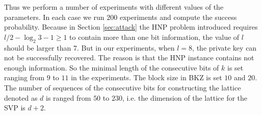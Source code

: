 Thus we perform a number of experiments with different values of the parameters.
 In each case we run $200$ experiments and compute the success probability.
Because in Section \ref{sec:attack} the HNP problem introduced requires $l/2 - \log_{2}{3} -1 \geq 1$ to contain more than one bit information, the value of $l$ should be larger than $7$.
 But in our experiments, when $l = 8$, the private key can not be successfully recovered.
  The reason is that the HNP instance contains not enough information.
So the minimal length of the consecutive bits of $k$ is set ranging from $9$ to $11$ in the experiments.
The block size in BKZ is set $10$  and $20$.
The number of sequences of the consecutive bits for constructing the lattice denoted as $d$ is ranged from $50$ to $230$,
i.e. the dimension of the lattice for the SVP is $d + 2$.

